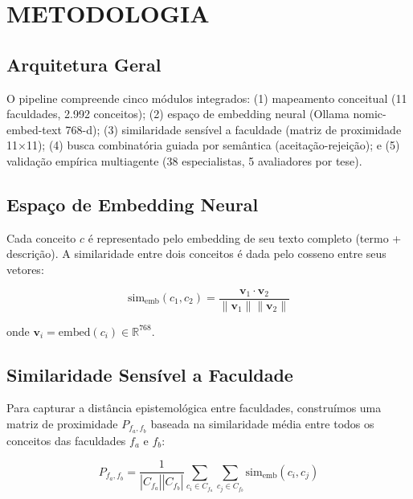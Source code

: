 \documentclass[a4paper,12pt]{article}
\begin{document}
\section{METODOLOGIA}\label{sec:metodologia}

\subsection{Arquitetura Geral}

O pipeline compreende cinco módulos integrados: (1) mapeamento conceitual (11 faculdades, 
2.992 conceitos); (2) espaço de embedding neural (Ollama nomic-embed-text 768-d); 
(3) similaridade sensível a faculdade (matriz de proximidade 11×11); (4) busca combinatória 
guiada por semântica (aceitação-rejeição); e (5) validação empírica multiagente 
(38 especialistas, 5 avaliadores por tese).

\subsection{Espaço de Embedding Neural}

Cada conceito $c$ é representado pelo embedding de seu texto completo 
(termo + descrição). A similaridade entre dois conceitos é dada pelo cosseno entre 
seus vetores:

\begin{equation}
    \text{sim}_\text{emb}(c_1, c_2) = \frac{\mathbf{v}_1 \cdot \mathbf{v}_2}
    {\|\mathbf{v}_1\| \|\mathbf{v}_2\|}
\end{equation}

onde $\mathbf{v}_i = \text{embed}(c_i) \in \mathbb{R}^{768}$.

\subsection{Similaridade Sensível a Faculdade}

Para capturar a distância epistemológica entre faculdades, construímos uma matriz de 
proximidade $P_{f_a,f_b}$ baseada na similaridade média entre todos os conceitos 
das faculdades $f_a$ e $f_b$:

\begin{equation}
    P_{f_a,f_b} = \frac{1}{|C_{f_a}||C_{f_b}|} 
    \sum_{c_i \in C_{f_a}} \sum_{c_j \in C_{f_b}} \text{sim}_\text{emb}(c_i, c_j)
\end{equation}
\end{document}
